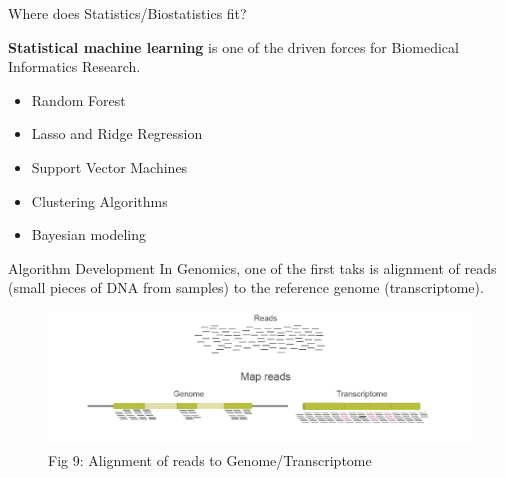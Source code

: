 \documentclass{beamer}
\begin{document}
	\begin{frame}{Where does Statistics/Biostatistics fit?}
		
		{\bf Statistical machine learning} is one of the driven forces for Biomedical Informatics Research. 
		
		\begin{itemize}
			\item Random Forest
			\item Lasso and Ridge Regression
			\item Support Vector Machines
			\item Clustering Algorithms
			\item Bayesian modeling
		\end{itemize}
	\end{frame}
	
	\begin{frame}{Algorithm Development}
		In Genomics, one of the first taks is alignment of reads (small pieces of
		DNA from samples) to the reference genome (transcriptome).
		\begin{figure}[h]
			\centering
			\includegraphics[scale=0.45]{Figures/alignment.png}
			\caption{Fig 9: Alignment of reads to Genome/Transcriptome}
		\end{figure}	
	\end{frame}
	
\end{document}

